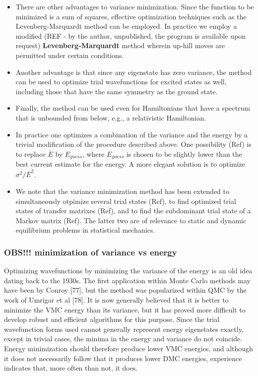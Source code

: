 \documentclass[twoside,english]{uiofysmaster}
\begin{document}
\begin{itemize}
	\item  There are other advantages to variance minimization. Since the function to be minimized is a sum of squares, effective optimization techniques such as the Levenberg-Marquardt method can be employed. In practice we employ a modified (REF - by the author, unpublished, the program is available upon request) \textbf{Levenberg-Marquardt} method wherein up-hill moves are permitted under certain conditions. 
	\item Another advantage is that since any eigenstate has zero variance, the method can be used to optimize trial wavefunctions for excited states as well, including those that have the same symmetry as the ground state. 
	\item Finally, the method can be used even for Hamiltonians that have a spectrum that is unbounded from below, e.g., a relativistic Hamiltonian.
	\item In practice one optimizes a combination of the variance and the energy by a trivial modification of the procedure described above. One possibility (Ref) is to replace $\bar{E}$ by $E_{guess}$, where $E_{guess}$ is chosen to be slightly lower than the best current estimate for the energy. A more elegant solution \cite{Meierovich1996} is to optimize $\sigma^2 / \bar{E}^2$.
	\item We note that the variance minimization method has been extended to simultaneously otpimize several trial states (Ref), to find optimized trial states of transfer matrixes (Ref), and to find the subdominant trial state of a Markov matrix (Ref). The latter two are of relevance to static and dynamic equilibrium problems in statistical mechanics.
\end{itemize}
\cite{Umrigar1999}

\subsubsection{OBS!!! minimization of variance vs energy}
Optimizing wavefunctions by minimizing the variance of the energy is an old idea dating back to the 1930s. The first application within Monte Carlo methods may have been by Conroy [77], but the method was popularized within QMC by the work of Umrigar et al [78]. It is now generally believed that it is better to minimize the VMC energy than its variance, but it has proved more difficult to develop robust and efficient algorithms for this purpose. Since the trial wavefunction forms used cannot generally represent energy eigenstates exactly, except in trivial cases, the minima in the energy and variance do not coincide. Energy minimization should therefore produce lower VMC energies, and although it does not necessarily follow that it produces lower DMC energies, experience indicates that, more often than not, it does.
\cite{Needs2010}
\end{document}
